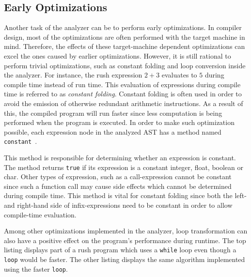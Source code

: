 \subsection{Early Optimizations}

Another task of the analyzer can be to perform early optimizations.
In compiler design, most of the optimizations are often performed with the target machine in mind.
Therefore, the effects of these target-machine dependent optimizations can excel the ones caused by earlier optimizations.
However, it is still rational to perform trivial optimizations, such as constant folding and loop conversion inside the analyzer.
For instance, the rush expression $2 + 3$ evaluates to $5$ during compile time instead of run time.
This evaluation of expressions during compile time is referred to as \emph{constant folding}.
Constant folding is often used in order to avoid the emission of otherwise redundant arithmetic instructions.
As a result of this, the compiled program will run faster since less computation is being performed when the program is executed.
In order to make such optimization possible, each expression node in the analyzed AST has a method named \texttt{constant}~\cite[p.~54]{wirth_compiler_construction_2005}.


This method is responsible for determining whether an expression is constant.
The method returns \texttt{true} if its expression is a constant integer, float, boolean or char.
Other types of expression, such as a call-expression cannot be constant since such a function call may cause side effects which cannot be determined during compile time.
This method is vital for constant folding since both the left- and right-hand side of infix-expressions need to be constant in order to allow compile-time evaluation.

Among other optimizations implemented in the analyzer, loop transformation can also have a positive effect on the program's performance during runtime.
The top listing displays part of a rush program which uses a \texttt{while} loop even though a \texttt{loop} would be faster.
The other listing displays the same algorithm implemented using the faster \texttt{loop}.


